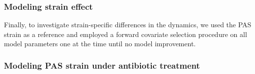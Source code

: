 \documentclass{article}
\begin{document}
\subsubsection{Modeling strain effect}

Finally, to investigate strain-specific differences in the dynamics, we used the PAS strain as a reference and employed a forward covariate selection procedure on all model parameters one at the time until no model improvement.
















\subsubsection{Modeling PAS strain under antibiotic treatment}

\end{document}
